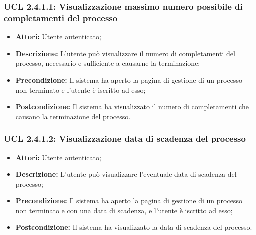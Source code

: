 \hypertarget{L2.4.1.1}{}
\subsubsection{UCL 2.4.1.1: Visualizzazione massimo numero possibile di completamenti del processo}
\begin{itemize}
\item \textbf{Attori:} Utente autenticato;
\item \textbf{Descrizione:} L'utente può visualizzare il numero di completamenti del processo, necessario e sufficiente a causarne la terminazione;
\item \textbf{Precondizione:} Il sistema ha aperto la pagina di gestione di un processo non terminato e l'utente è iscritto ad esso;
\item \textbf{Postcondizione:} Il sistema ha visualizzato il numero di completamenti che causano la terminazione del processo.
\end{itemize}

\hypertarget{L2.4.1.2}{}
\subsubsection{UCL 2.4.1.2: Visualizzazione data di scadenza del processo}
\begin{itemize}
\item \textbf{Attori:} Utente autenticato;
\item \textbf{Descrizione:} L'utente può visualizzare l'eventuale data di scadenza del processo;
\item \textbf{Precondizione:} Il sistema ha aperto la pagina di gestione di un processo  non terminato e con una data di scadenza, e l'utente è iscritto ad esso;
\item \textbf{Postcondizione:} Il sistema ha visualizzato la data di scadenza del processo.
\end{itemize}

